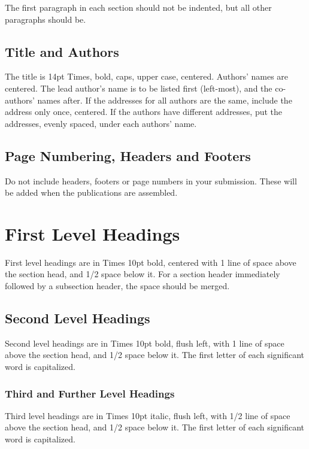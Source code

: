 \documentclass{article}
\begin{document}
The first paragraph in each section should not be indented, but all other paragraphs should be.

\subsection{Title and Authors}

The title is 14pt Times, bold, caps, upper case, centered.
Authors' names are centered. 
The lead author's name is to be listed first (left-most), and the co-authors' names after. 
If the addresses for all authors are the same, include the address only once, centered. 
If the authors have different addresses, put the addresses, evenly spaced, under each authors' name.

\subsection{Page Numbering, Headers and Footers}

Do not include headers, footers or page numbers in your submission. 
These will be added when the publications are assembled.

\section{First Level Headings}

First level headings are in Times 10pt bold, 
centered with 1 line of space above the section head, and 1/2 space below it. 
For a section header immediately followed by a subsection header, the space should be merged.

\subsection{Second Level Headings}

Second level headings are in Times 10pt bold, flush left, 
with 1 line of space above the section head, and 1/2 space below it. 
The first letter of each significant word is capitalized.

\subsubsection{Third and Further Level Headings}

Third level headings are in Times 10pt italic, flush left, 
with 1/2 line of space above the section head, and 1/2 space below it. 
The first letter of each significant word is capitalized.
\end{document}
